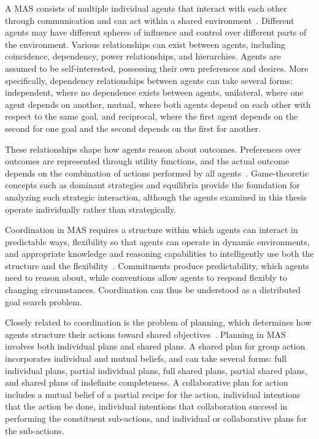 \documentclass[
english,                 %
bibtex,                  %
]{kththesis}
\numberwithin{listing}{chapter}
\begin{document}
A \gls{MAS} consists of multiple individual agents that interact with each other through communication and can act within a shared environment~\cite{wooldridge_introduction_2012}. Different agents may have different spheres of influence and control over different parts of the environment. Various relationships can exist between agents, including coincidence, dependency, power relationships, and hierarchies. Agents are assumed to be self-interested, possessing their own preferences and desires. More specifically, dependency relationships between agents can take several forms: independent, where no dependence exists between agents, unilateral, where one agent depends on another, mutual, where both agents depend on each other with respect to the same goal, and reciprocal, where the first agent depends on the second for one goal and the second depends on the first for another.

These relationships shape how agents reason about outcomes. Preferences over outcomes are represented through utility functions, and the actual outcome depends on the combination of actions performed by all agents~\cite{wooldridge_introduction_2012}. Game-theoretic concepts such as dominant strategies and equilibria provide the foundation for analyzing such strategic interaction, although the agents examined in this thesis operate individually rather than strategically.

Coordination in \gls{MAS} requires a structure within which agents can interact in predictable ways, flexibility so that agents can operate in dynamic environments, and appropriate knowledge and reasoning capabilities to intelligently use both the structure and the flexibility~\cite{jennings_commitments_1993}. Commitments produce predictability, which agents need to reason about, while conventions allow agents to respond flexibly to changing circumstances. Coordination can thus be understood as a distributed goal search problem.

Closely related to coordination is the problem of planning, which determines how agents structure their actions toward shared objectives~\cite{grosz_collaborative_1996}. Planning in \gls{MAS} involves both individual plans and shared plans. A shared plan for group action incorporates individual and mutual beliefs, and can take several forms: full individual plans, partial individual plans, full shared plans, partial shared plans, and shared plans of indefinite completeness. A collaborative plan for action includes a mutual belief of a partial recipe for the action, individual intentions that the action be done, individual intentions that collaboration succeed in performing the constituent sub-actions, and individual or collaborative plans for the sub-actions.
\end{document}

